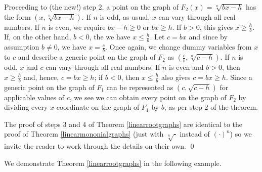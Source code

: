 Proceeding to (the new!) step 2, a point on the graph of $F_{2}(x) = \sqrt[n]{bx-h}$ has the form $(x, \sqrt[n]{bx-h})$.  If $n$ is odd, as usual, $x$ can vary through all real numbers.  If $n$ is even, we require $bx-h \geq 0$ or $bx \geq h$.  If $b>0$, this gives $x \geq \frac{h}{b}$.  If, on the other hand, $b<0$, the we have $x \leq \frac{h}{b}$.   Let  $c = bx$ and since by assumption $b \neq 0$, we have $x = \frac{c}{b}$. Once again, we change dummy variables from $x$ to $c$ and describe a generic point on the graph of $F_{2}$ as $\left( \frac{c}{b}, \sqrt[n]{c - h} \right)$.  If $n$ is odd, $x$ and $c$ can vary through all real numbers.  If $n$ is even and $b>0$, then $x \geq \frac{h}{b}$ and, hence, $c = bx \geq h$;  if $b<0$, then $x \leq \frac{h}{b}$ also gives $c = bx \geq h$.  Since a generic point on the graph of $F_{1}$ can be represented as $(c, \sqrt{c-h})$ for applicable values of $c$, we see we can obtain every point on the graph of $F_{2}$ by dividing every $x$-coordinate on the graph of $F_{1}$ by $b$, as per step 2 of the theorem.

The proof of steps 3 and 4 of Theorem \ref{linearrootgraphs} are identical to the proof of  Theorem \ref{linearmononialgraphs} (just with $\sqrt[n]{\cdot}$ instead of $( \cdot )^n$) so we invite the reader to work through the details on their own.  \qed

We  demonstrate Theorem \ref{linearrootgraphs} in the following example.


